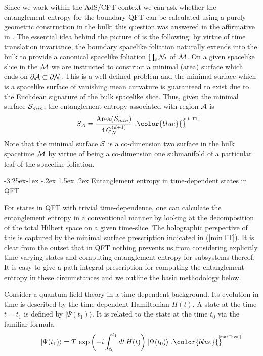 \documentclass[12pt]{article}
\makeatletter
\renewcommand\subsection{\@startsection{subsection}{2}{\z@}%
                                     {-3.25ex\@plus -1ex \@minus -.2ex}%
                                     {1.5ex \@plus .2ex}%
                                     {\normalfont\bfseries}}
\def\req#1{(\ref{#1})}
\def\p{\partial}
\def\CA{{\cal A}}
\def\CS{{\cal S}}
\def\p{\partial}
\def\p{\partial}
\def\ket#1{\mid  \! \! #1   \rangle}
\def\Label#1{\label{#1}%
{ \color{blue}{\smash{\hbox to0pt{\raise2ex\hbox{\tiny[#1]}\hss}}}}}
\def\bulk{{\cal M}}
\def\bdys{\p{\cal N}}
\def\ms{\CS}
\def\rA{\CA}
\def\brA{\p \CA}
\def\area#1{{\rm Area}(#1)}
\makeatother
\begin{document}
Since we work within the AdS/CFT context we can ask whether the entanglement entropy
 for the boundary QFT can be calculated using a purely geometric construction in
 the bulk; this question was answered in the affirmative in
 \cite{Ryu:2006bv, Ryu:2006ef}. The essential
  idea behind the picture of \cite{Ryu:2006bv, Ryu:2006ef}
  is the following: by virtue of time
   translation invariance, the boundary spacelike foliation naturally extends into the bulk
    to provide a canonical spacelike foliation $\prod_{t}{\cal N}_t$ of $\bulk$.
    On a given spacelike
     slice in the $\bulk$ we are instructed to construct a minimal (area) surface which
      ends on $\brA \subset \bdys$. This is a well defined problem and the minimal surface
       which is a spacelike surface of vanishing mean curvature is guaranteed to exist
        due to the Euclidean signature of the bulk spacelike slice. Thus, given the minimal
         surface $\ms_{min}$, the entanglement entropy associated with region $\rA$ is
%
\begin{equation}
S_\rA = {\area{\ms_{min}}  \over 4 \, G_N^{(d+1)} } \ .
\Label{minTT}
\end{equation}
%
Note that the minimal surface $\ms$ is a co-dimension two surface in the bulk spacetime
 $\bulk$ by virtue of being a co-dimension one submanifold of a particular leaf of the
  spacelike foliation.

\subsection{Entanglement entropy in time-dependent states in QFT}
\label{tdqft}

For states in QFT with trivial time-dependence, one can calculate the entanglement entropy in a conventional manner by looking at the decomposition of the total Hilbert space on a given time-slice. The holographic perspective of this is captured by the minimal surface prescription indicated in \req{minTT}. It is clear from the outset that in QFT nothing prevents us from considering explicitly time-varying states and computing entanglement entropy for subsystems thereof. It is easy to give a path-integral prescription for computing the entanglement entropy in these circumstances and we outline the basic methodology below.


Consider a quantum field theory in a time-dependent background. Its
evolution in time is described by the time-dependent Hamiltonian
$H(t)$. A state at the time $t=t_1$ is defined by $\ket{\Psi(t_1)}$.
It is
 related to the state at the time $t_0$ via the familiar formula
 \begin{equation}
\ket{\Psi(t_1)}=T\, \exp\left(-i\int^{t_1}_{t_0} dt \,
H(t)\right)\ket{\Psi(t_0)} \ .
\Label{statTevol}
\end{equation}
%
\end{document}
